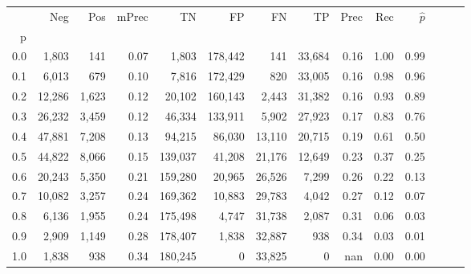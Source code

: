 \begin{tabular}{rrrrrrrrrrrrrr}
\toprule
{} &     Neg &    Pos & mPrec &       TN &       FP &      FN &      TP &  Prec &   Rec & $\hat{p}$ \\
p   &         &        &       &          &          &         &         &       &       &           \\
\midrule
0.0 &   1,803 &    141 &  0.07 &    1,803 &  178,442 &     141 &  33,684 &  0.16 &  1.00 &      0.99 \\
0.1 &   6,013 &    679 &  0.10 &    7,816 &  172,429 &     820 &  33,005 &  0.16 &  0.98 &      0.96 \\
0.2 &  12,286 &  1,623 &  0.12 &   20,102 &  160,143 &   2,443 &  31,382 &  0.16 &  0.93 &      0.89 \\
0.3 &  26,232 &  3,459 &  0.12 &   46,334 &  133,911 &   5,902 &  27,923 &  0.17 &  0.83 &      0.76 \\
0.4 &  47,881 &  7,208 &  0.13 &   94,215 &   86,030 &  13,110 &  20,715 &  0.19 &  0.61 &      0.50 \\
0.5 &  44,822 &  8,066 &  0.15 &  139,037 &   41,208 &  21,176 &  12,649 &  0.23 &  0.37 &      0.25 \\
0.6 &  20,243 &  5,350 &  0.21 &  159,280 &   20,965 &  26,526 &   7,299 &  0.26 &  0.22 &      0.13 \\
0.7 &  10,082 &  3,257 &  0.24 &  169,362 &   10,883 &  29,783 &   4,042 &  0.27 &  0.12 &      0.07 \\
0.8 &   6,136 &  1,955 &  0.24 &  175,498 &    4,747 &  31,738 &   2,087 &  0.31 &  0.06 &      0.03 \\
0.9 &   2,909 &  1,149 &  0.28 &  178,407 &    1,838 &  32,887 &     938 &  0.34 &  0.03 &      0.01 \\
1.0 &   1,838 &    938 &  0.34 &  180,245 &        0 &  33,825 &       0 &   nan &  0.00 &      0.00 \\
\bottomrule
\end{tabular}
